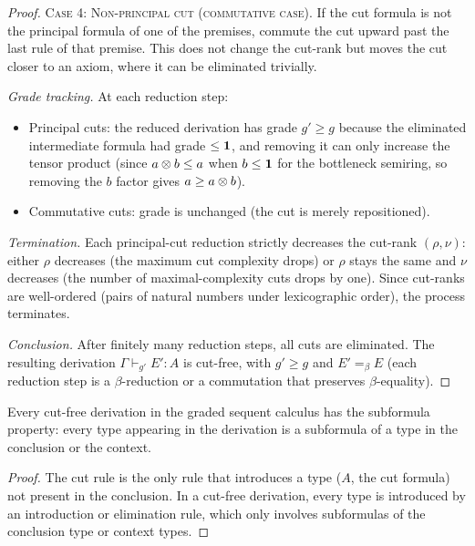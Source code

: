 \begin{proof}
\textsc{Case 4: Non-principal cut (commutative case).}
If the cut formula is not the principal formula of one of the
premises, commute the cut upward past the last rule of that premise.
This does not change the cut-rank but moves the cut closer to an
axiom, where it can be eliminated trivially.

\emph{Grade tracking.}  At each reduction step:
\begin{itemize}[nosep]
\item Principal cuts: the reduced derivation has grade $g' \geq g$
  because the eliminated intermediate formula had grade $\leq \mathbf{1}$,
  and removing it can only increase the tensor product (since
  $a \otimes b \leq a$ when $b \leq \mathbf{1}$ for the bottleneck semiring,
  so removing the $b$ factor gives $a \geq a \otimes b$).
\item Commutative cuts: grade is unchanged (the cut is merely
  repositioned).
\end{itemize}

\emph{Termination.}  Each principal-cut reduction strictly decreases
the cut-rank $(\rho, \nu)$: either $\rho$ decreases (the maximum
cut complexity drops) or $\rho$ stays the same and $\nu$ decreases
(the number of maximal-complexity cuts drops by one).  Since
cut-ranks are well-ordered (pairs of natural numbers under
lexicographic order), the process terminates.

\emph{Conclusion.}  After finitely many reduction steps, all cuts
are eliminated.  The resulting derivation
$\Gamma \vdash_{g'} E' : A$ is cut-free, with $g' \geq g$ and
$E' =_\beta E$ (each reduction step is a $\beta$-reduction or a
commutation that preserves $\beta$-equality).
\end{proof}

\begin{corollary}
\label{cor:subformula}
Every cut-free derivation in the graded sequent calculus has the
subformula property: every type appearing in the derivation is a
subformula of a type in the conclusion or the context.
\end{corollary}

\begin{proof}
The cut rule is the only rule that introduces a type ($A$, the cut
formula) not present in the conclusion.  In a cut-free derivation,
every type is introduced by an introduction or elimination rule,
which only involves subformulas of the conclusion type or context
types.
\end{proof}

